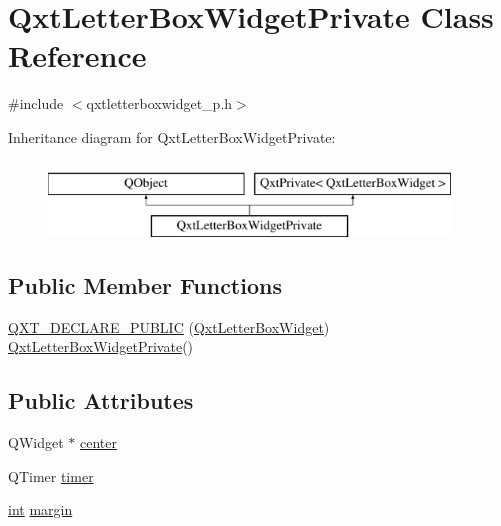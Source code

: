 \hypertarget{class_qxt_letter_box_widget_private}{\section{Qxt\-Letter\-Box\-Widget\-Private Class Reference}
\label{class_qxt_letter_box_widget_private}
}


{\ttfamily \#include $<$qxtletterboxwidget\-\_\-p.\-h$>$}

Inheritance diagram for Qxt\-Letter\-Box\-Widget\-Private\-:\begin{figure}[H]
\begin{center}
\leavevmode
\includegraphics[height=2.000000cm]{class_qxt_letter_box_widget_private}
\end{center}
\end{figure}
\subsection*{Public Member Functions}
\begin{DoxyCompactItemize}
\item 
\hyperlink{class_qxt_letter_box_widget_private_ae34fbd1396827334d0c770b4b09648ce}{Q\-X\-T\-\_\-\-D\-E\-C\-L\-A\-R\-E\-\_\-\-P\-U\-B\-L\-I\-C} (\hyperlink{class_qxt_letter_box_widget}{Qxt\-Letter\-Box\-Widget}) \hyperlink{class_qxt_letter_box_widget_private}{Qxt\-Letter\-Box\-Widget\-Private}()
\end{DoxyCompactItemize}
\subsection*{Public Attributes}
\begin{DoxyCompactItemize}
\item 
Q\-Widget $\ast$ \hyperlink{class_qxt_letter_box_widget_private_a6c8c600ead979a91013099a142a1a24e}{center}
\item 
Q\-Timer \hyperlink{class_qxt_letter_box_widget_private_aab23adbcd25387dbfc94c313780ff491}{timer}
\item 
\hyperlink{ioapi_8h_a787fa3cf048117ba7123753c1e74fcd6}{int} \hyperlink{class_qxt_letter_box_widget_private_ae00838d6f99b0187e3536bb2f02de399}{margin}
\end{DoxyCompactItemize}
